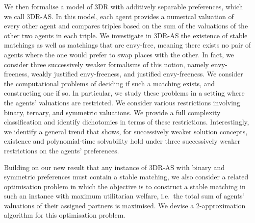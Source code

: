 We then formalise a model of 3DR with additively separable preferences, which we call 3DR-AS. In this model, each agent provides a numerical valuation of every other agent and compares triples based on the sum of the valuations of the other two agents in each triple. We investigate in 3DR-AS the existence of stable matchings as well as matchings that are envy-free, meaning there exists no pair of agents where the one would prefer to swap places with the other. In fact, we consider three successively weaker formalisms of this notion, namely envy-freeness, weakly justified envy-freeness, and justified envy-freeness. We consider the computational problems of deciding if such a matching exists, and constructing one if so. In particular, we study these problems in a setting where the agents' valuations are restricted. We consider various restrictions involving binary, ternary, and symmetric valuations. We provide a full complexity classification and identify dichotomies in terms of these restrictions. Interestingly, we identify a general trend that shows, for successively weaker solution concepts, existence and polynomial-time solvability hold under three successively weaker restrictions on the agents' preferences. 

Building on our new result that any instance of 3DR-AS with binary and symmetric preferences must contain a stable matching, we also consider a related optimisation problem in which the objective is to construct a stable matching in such an instance with maximum utilitarian welfare, i.e.\ the total sum of agents' valuations of their assigned partners is maximised. We devise a $2$-approximation algorithm for this optimisation problem.

